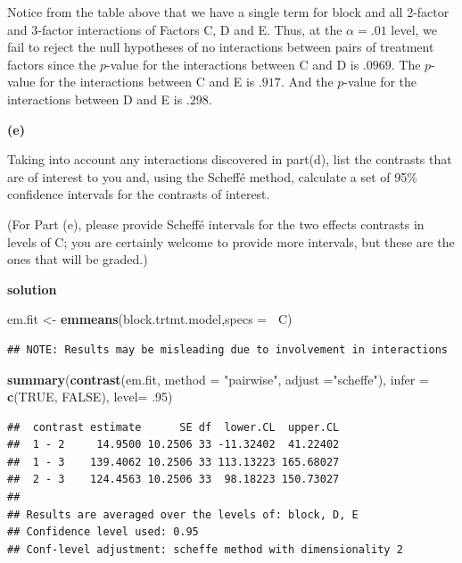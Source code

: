 \documentclass[12pt,]{article}
\newenvironment{Shaded}{\begin{snugshade}}{\end{snugshade}}
\newcommand{\KeywordTok}[1]{\textcolor[rgb]{0.13,0.29,0.53}{\textbf{#1}}}
\newcommand{\DataTypeTok}[1]{\textcolor[rgb]{0.13,0.29,0.53}{#1}}
\newcommand{\DecValTok}[1]{\textcolor[rgb]{0.00,0.00,0.81}{#1}}
\newcommand{\StringTok}[1]{\textcolor[rgb]{0.31,0.60,0.02}{#1}}
\newcommand{\OtherTok}[1]{\textcolor[rgb]{0.56,0.35,0.01}{#1}}
\newcommand{\OperatorTok}[1]{\textcolor[rgb]{0.81,0.36,0.00}{\textbf{#1}}}
\newcommand{\NormalTok}[1]{#1}
\begin{document}
Notice from the table above that we have a single term for block and all
2-factor and 3-factor interactions of Factors C, D and E. Thus, at the
\(\alpha = .01\) level, we fail to reject the null hypotheses of no
interactions between pairs of treatment factors since the \(p\)-value
for the interactions between C and D is \(.0969\). The \(p\)-value for
the interactions between C and E is \(.917\). And the \(p\)-value for
the interactions between D and E is \(.298\).

\textbf{(e)}

Taking into account any interactions discovered in part(d), list the
contrasts that are of interest to you and, using the Scheffé method,
calculate a set of 95\% confidence intervals for the contrasts of
interest.

(For Part (e), please provide Scheffé intervals for the two effects
contrasts in levels of C; you are certainly welcome to provide more
intervals, but these are the ones that will be graded.)

\textbf{solution}

\begin{Shaded}
\begin{Highlighting}[]
\NormalTok{em.fit <-}\StringTok{ }\KeywordTok{emmeans}\NormalTok{(block.trtmt.model,}\DataTypeTok{specs =}\OperatorTok{~}\StringTok{ }\NormalTok{C)}
\end{Highlighting}
\end{Shaded}

\begin{verbatim}
## NOTE: Results may be misleading due to involvement in interactions
\end{verbatim}

\begin{Shaded}
\begin{Highlighting}[]
\KeywordTok{summary}\NormalTok{(}\KeywordTok{contrast}\NormalTok{(em.fit, }\DataTypeTok{method =} \StringTok{"pairwise"}\NormalTok{, }\DataTypeTok{adjust =}\StringTok{"scheffe"}\NormalTok{), }
        \DataTypeTok{infer =} \KeywordTok{c}\NormalTok{(}\OtherTok{TRUE}\NormalTok{, }\OtherTok{FALSE}\NormalTok{), }\DataTypeTok{level=}\NormalTok{ .}\DecValTok{95}\NormalTok{)}
\end{Highlighting}
\end{Shaded}

\begin{verbatim}
##  contrast estimate      SE df  lower.CL  upper.CL
##  1 - 2     14.9500 10.2506 33 -11.32402  41.22402
##  1 - 3    139.4062 10.2506 33 113.13223 165.68027
##  2 - 3    124.4563 10.2506 33  98.18223 150.73027
## 
## Results are averaged over the levels of: block, D, E 
## Confidence level used: 0.95 
## Conf-level adjustment: scheffe method with dimensionality 2
\end{verbatim}
\end{document}
